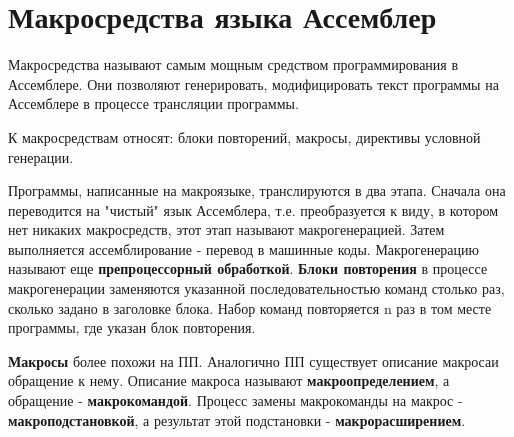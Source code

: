 \section{Макросредства языка Ассемблер}

Макросредства называют самым мощным средством программирования в Ассемблере. Они позволяют генерировать, модифицировать текст программы на Ассемблере в процессе трансляции программы.

К макросредствам относят: блоки повторений, макросы, директивы условной генерации.

Программы, написанные на макроязыке, транслируются в два этапа. Сначала она переводится на "чистый" язык Ассемблера, т.е. преобразуется к виду, в котором нет никаких макросредств, этот этап называют макрогенерацией. Затем выполняется ассемблирование - перевод в машинные коды. Макрогенерацию называют еще \textbf{препроцессорный обработкой}.
\textbf{Блоки повторения} в процессе макрогенерации заменяются указанной последовательностью команд столько раз, сколько задано в заголовке блока. Набор команд повторяется n раз в том месте программы, где указан блок повторения.

\textbf{Макросы} более похожи на ПП. Аналогично ПП существует описание макросаи обращение к нему. Описание макроса называют \textbf{макроопределением}, а обращение - \textbf{макрокомандой}. Процесс замены макрокоманды на макрос - \textbf{макроподстановкой}, а результат этой подстановки - \textbf{макрорасширением}.  